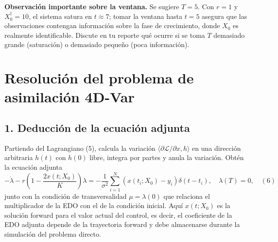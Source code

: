 \documentclass[12pt,spanish,mexico]{article}
\numberwithin{equation}{section}
\theoremstyle{definition}
\theoremstyle{remark}
\begin{document}
\textbf{Observación importante sobre la ventana.} Se sugiere \(T = 5\). Con \(r = 1\) y \(X_0^{\dagger} = 10\), el sistema satura en \(t \approx 7\); tomar la ventana hasta \(t = 5\) asegura que las observaciones contengan información sobre la fase de crecimiento, donde \(X_0\) es realmente identificable. Discute en tu reporte qué ocurre si se toma \(T\) demasiado grande (saturación) o demasiado pequeño (poca información).

\section{Resolución del problema de asimilación 4D-Var}

\subsection{1. Deducción de la ecuación adjunta}
Partiendo del Lagrangiano (5), calcula la variación \(\langle \partial\mathcal{L}/\partial x, h \rangle\) en una dirección arbitraria \(h(t)\) con \(h(0)\) libre, integra por partes y anula la variación. Obtén la ecuación adjunta
\[
-\dot{\lambda} - r \left( 1 - \frac{2x(t; X_0)}{K} \right) \lambda = -\frac{1}{\sigma^2} \sum_{i=1}^{N} \left( x(t_i; X_0) - y_i \right) \delta(t - t_i), \quad \lambda(T) = 0, \quad (6)
\]
junto con la condición de transversalidad \(\mu = \lambda(0)\) que relaciona el multiplicador de la EDO con el de la condición inicial. Aquí \(x(t; X_0)\) es la solución forward para el valor actual del control, es decir, el coeficiente de la EDO adjunta depende de la trayectoria forward y debe almacenarse durante la simulación del problema directo.
\end{document}
